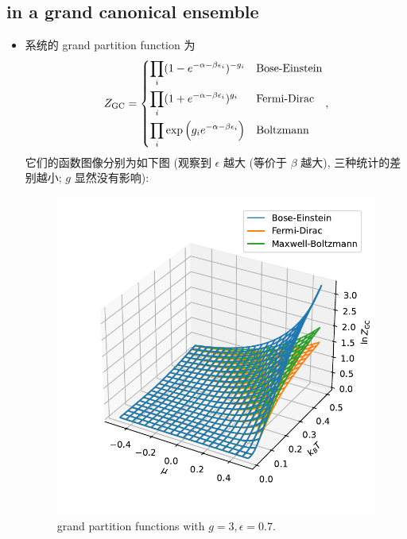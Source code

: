 \subsection{in a grand canonical ensemble}
\begin{itemize}
	\item 系统的 grand partition function 为
	\begin{equation} \label{6.1.10}
		Z_\text{GC} = \begin{dcases}
			\prod_i (1 - e^{- \alpha - \beta \epsilon_i})^{- g_i} & \text{Bose-Einstein} \\
			\prod_i (1 + e^{- \alpha - \beta \epsilon_i})^{g_i} & \text{Fermi-Dirac} \\
			\prod_i \exp \Big( g_i e^{- \alpha - \beta \epsilon_i} \Big) & \text{Boltzmann}
		\end{dcases},
	\end{equation}
	它们的函数图像分别为如下图 (观察到 $\epsilon$ 越大 (等价于 $\beta$ 越大), 三种统计的差别越小; $g$ 显然没有影响):
	
	\begin{figure}[H]
		\centering
		\includegraphics[scale=0.75]{figures/grand partition functions with g = 3, epsilon = 0.7.pdf}
		\caption{grand partition functions with $g = 3, \epsilon = 0.7$.}
	\end{figure}
	

\end{itemize}
